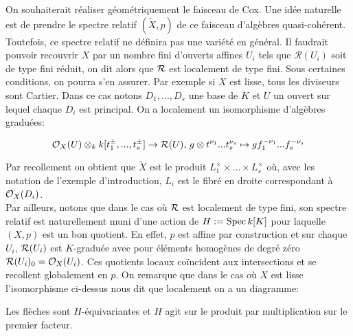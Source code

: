 On souhaiterait réaliser géométriquement le faisceau de Cox. Une idée naturelle est de prendre le spectre relatif $(\widetilde{X}, p)$ de ce faisceau d'algèbres quasi-cohérent. Toutefois, ce spectre relatif ne définira pas une variété en général. Il faudrait pouvoir recouvrir $X$ par un nombre fini d'ouverts affines $U_i$ tels que $\mathcal{R}(U_i)$ soit de type fini réduit, on dit alors que $\mathcal{R}$ est localement de type fini. Sous certaines conditions, on pourra s'en assurer. Par exemple si $X$ est lisse, tous les diviseurs sont Cartier. Dans ce cas notons $D_1,...,D_s$ une base de $K$ et $U$ un ouvert sur lequel chaque $D_i$ est principal. On a localement un isomorphisme d'algèbres graduées:

$$\mathcal{O}_X(U)\otimes_k k[t_1^{\pm},...,t_s^{\pm}] \rightarrow \mathcal{R}(U),\, g\otimes t^{\nu_1}...t_s^{\nu_s}\mapsto gf_1^{-\nu_1}...f_s^{-\nu_s}$$

Par recollement on obtient que $\widetilde{X}$ est le produit $L_1^\times\times...\times L_s^\times$ où, avec les notation de l'exemple d'introduction, $L_i$ est le fibré en droite correspondant à $\mathcal{O}_X(D_i)$.\\
Par ailleurs, notons que dans le cas où $\mathcal{R}$ est localement de type fini, son spectre relatif est naturellement muni d'une action de $H:=\operatorname{Spec} k[K]$ pour laquelle $(X,p)$ est un bon quotient.  En effet, $p$ est affine par construction et sur chaque $U_i$, $\mathcal{R}(U_i)$ est $K$-graduée avec pour éléments homogènes de degré zéro $\mathcal{R}(U_i)_0=\mathcal{O}_X(U_i)$. Ces quotients locaux coïncident aux intersections et se recollent globalement en $p$. On remarque que dans le cas où $X$ est lisse l'isomorphisme ci-dessus nous dit que localement on a un diagramme:
\begin{center}
\end{center}

Les flèches sont $H$-équivariantes et $H$ agit sur le produit par multiplication sur le premier facteur.

